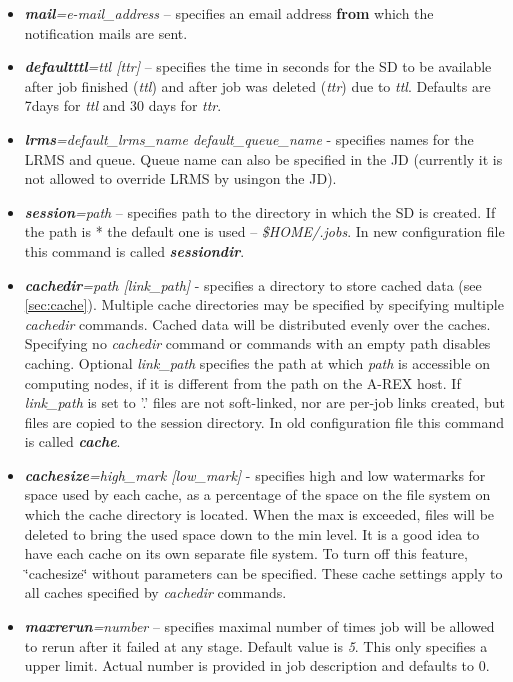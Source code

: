 \documentclass{article}                            %
\begin{document}
\begin{itemize}
\item \textbf{\textit{mail}}\textit{=e-mail\_address} -- specifies an email
address \textbf{from} which the notification mails are sent.
\item \textbf{\textit{defaultttl}}\textit{=ttl {[}ttr]} -- specifies the
time in seconds for the SD to be available after job finished (\emph{ttl})
and after job was deleted (\emph{ttr}) due to \emph{ttl}. Defaults
are 7days for \emph{ttl} and 30 days for \emph{ttr}.
\item \textbf{\textit{lrms}}\textit{=default\_lrms\_name default\_queue\_name}
- specifies names for the LRMS and queue. Queue name can also be specified
in the JD (currently it is not allowed to override LRMS by usingon
the JD).
\item \textbf{\textit{session}}\textit{=path} -- specifies path to the directory
in which the SD is created. If the path is {*} the default one is
used -- \textit{\$HOME/.jobs}. In new configuration file this command
is called \textbf{\textit{sessiondir}}.
\item \textbf{\textit{cachedir}}\textit{=path {[}link\_path]} - specifies
a directory to store cached data (see \ref{sec:cache}).\emph{ }Multiple
cache directories may be specified by specifying multiple \emph{cachedir}
commands. Cached data will be distributed evenly over the caches.
Specifying no \emph{cachedir }command or commands with an empty path
disables caching. Optional \textit{link\_path} specifies the path
at which \emph{path} is accessible on computing nodes, if it is different
from the path on the A-REX host. If \textit{link\_path} is set to '.'
files are not soft-linked, nor are per-job links created, but files
are copied to the session directory. In old configuration file this
command is called \textbf{\textit{cache}}.
\item \textbf{\textit{cachesize}}\textit{=high\_mark {[}low\_mark]} - specifies
high and low watermarks for space used by each cache, as a percentage
of the space on the file system on which the cache directory is located.
When the max is exceeded, files will be deleted to bring the used
space down to the min level. It is a good idea to have each cache
on its own separate file system. To turn off this feature, \char`\"{}cachesize\char`\"{}
without parameters can be specified. These cache settings apply to
all caches specified by \emph{cachedir} commands.
\item \textbf{\textit{maxrerun}}\textit{=number} -- specifies maximal number
of times job will be allowed to rerun after it failed at any stage.
Default value is \emph{5}. This only specifies a upper limit. Actual
number is provided in job description and defaults to 0.
\end{itemize}
\end{document}
